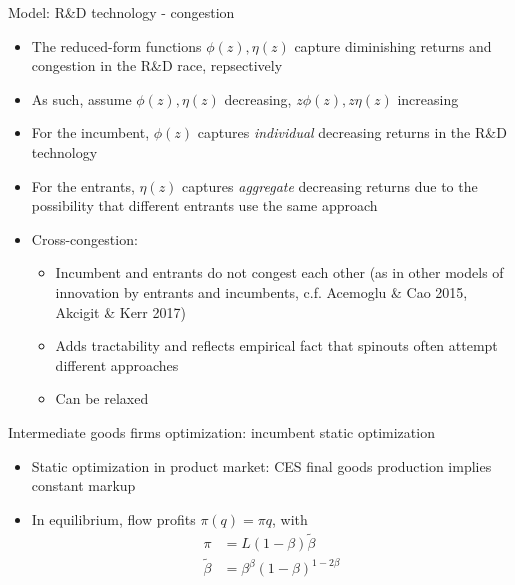 \documentclass[english,usenames,dvipsnames]{beamer}
\begin{document}
\begin{frame}{Model: R\&D technology - congestion}
\begin{itemize}
	\item The reduced-form functions $\phi(z),\eta(z)$ capture diminishing returns and congestion in the R\&D race, repsectively
	\item As such, assume $\phi(z),\eta(z)$ decreasing, $z\phi(z),z\eta(z)$ increasing
	\item For the incumbent, $\phi(z)$ captures \textit{individual} decreasing returns in the R\&D technology
	\item For the entrants, $\eta(z)$ captures \textit{aggregate} decreasing returns due to the possibility that different entrants use the same approach 
	\item Cross-congestion:
	\begin{itemize}
		\item Incumbent and entrants do not congest each other (as in other models of innovation by entrants and incumbents, c.f. Acemoglu \& Cao 2015, Akcigit \& Kerr 2017)
		\item Adds tractability and reflects empirical fact that spinouts often attempt different approaches
		\item Can be relaxed
	\end{itemize}
\end{itemize}
\end{frame}

\begin{frame}{Intermediate goods firms optimization: incumbent static optimization}
\begin{itemize}
	\item Static optimization in product market: CES final goods production implies constant markup
	\item In equilibrium, flow profits $\pi(q) = \pi q$, with
	\begin{align*}
	\pi &= L(1-\beta)\tilde{\beta} \\ 
	\tilde{\beta} &= \beta^{\beta} (1-\beta)^{1-2\beta}
	\end{align*}
\end{itemize}
\end{frame}
\end{document}
